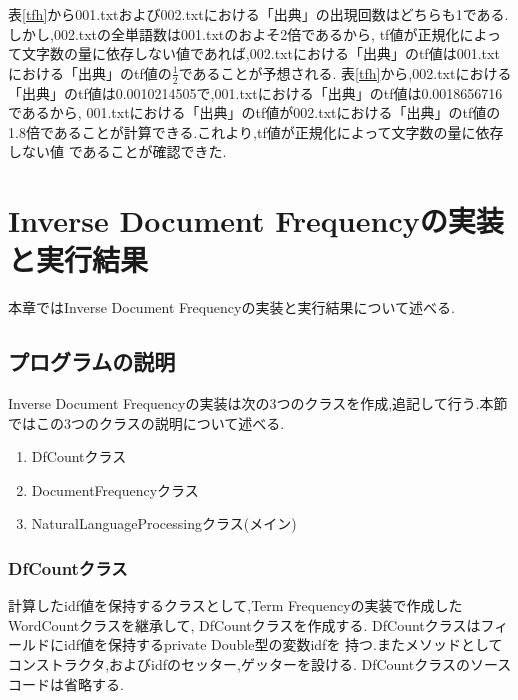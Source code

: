 \documentclass[a4j]{jarticle}
\begin{document}
	表\ref{tfh}から001.txtおよび002.txtにおける「出典」の出現回数はどちらも1である.しかし,002.txtの全単語数は001.txtのおよそ2倍であるから,
	tf値が正規化によって文字数の量に依存しない値であれば,002.txtにおける「出典」のtf値は001.txtにおける「出典」のtf値の$\frac{1}{2}$であることが予想される.
	表\ref{tfh}から,002.txtにおける「出典」のtf値は0.0010214505で,001.txtにおける「出典」のtf値は0.0018656716であるから,
	001.txtにおける「出典」のtf値が002.txtにおける「出典」のtf値の1.8倍であることが計算できる.これより,tf値が正規化によって文字数の量に依存しない値
	であることが確認できた.

\section{Inverse Document Frequencyの実装と実行結果}
本章ではInverse Document Frequencyの実装と実行結果について述べる.
\subsection{プログラムの説明}
Inverse Document Frequencyの実装は次の3つのクラスを作成,追記して行う.本節ではこの3つのクラスの説明について述べる.
\begin{enumerate}
  \item DfCountクラス
  \item DocumentFrequencyクラス
  \item NaturalLanguageProcessingクラス(メイン)
\end{enumerate}

\subsubsection{DfCountクラス}
計算したidf値を保持するクラスとして,Term Frequencyの実装で作成したWordCountクラスを継承して,
DfCountクラスを作成する.
DfCountクラスはフィールドにidf値を保持するprivate Double型の変数idfを
持つ.またメソッドとしてコンストラクタ,およびidfのセッター,ゲッターを設ける.
DfCountクラスのソースコードは省略する.
\end{document}
